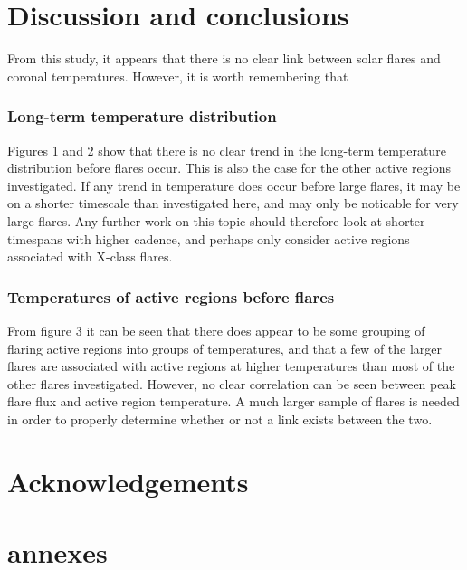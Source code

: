 \documentclass{article}
\begin{document}
\section{Discussion and conclusions}
From this study, it appears that there is no clear link between solar flares and coronal temperatures.
However, it is worth remembering that

\subsubsection{Long-term temperature distribution}
Figures 1 and 2 show that there is no clear trend in the long-term temperature distribution before flares occur.
This is also the case for the other active regions investigated. If any trend in temperature does occur before large flares, it may be on a shorter timescale than investigated here, and may only be noticable for very large flares.
Any further work on this topic should therefore look at shorter timespans with higher cadence, and perhaps only consider active regions associated with X-class flares.

\subsubsection{Temperatures of active regions before flares}
From figure 3 it can be seen that there does appear to be some grouping of flaring active regions into groups of temperatures, and that a few of the larger flares are associated with active regions at higher temperatures than most of the other flares investigated.
However, no clear correlation can be seen between peak flare flux and active region temperature.
A much larger sample of flares is needed in order to properly determine whether or not a link exists between the two.

\section*{Acknowledgements}

\section*{annexes}



\end{document}
